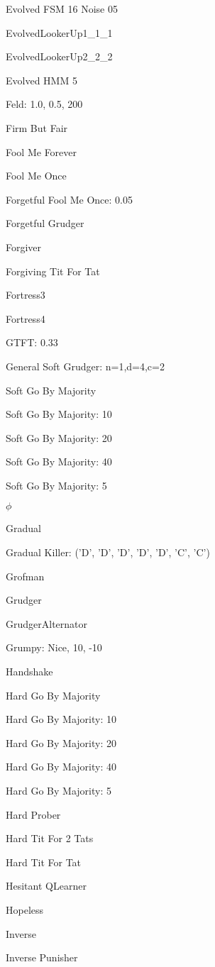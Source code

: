 \item Evolved FSM 16 Noise 05
\item EvolvedLookerUp1\_1\_1
\item EvolvedLookerUp2\_2\_2
\item Evolved HMM 5
\item Feld: 1.0, 0.5, 200
\item Firm But Fair
\item Fool Me Forever
\item Fool Me Once
\item Forgetful Fool Me Once: 0.05
\item Forgetful Grudger
\item Forgiver
\item Forgiving Tit For Tat
\item Fortress3
\item Fortress4
\item GTFT: 0.33
\item General Soft Grudger: n=1,d=4,c=2
\item Soft Go By Majority
\item Soft Go By Majority: 10
\item Soft Go By Majority: 20
\item Soft Go By Majority: 40
\item Soft Go By Majority: 5
\item $\phi$
\item Gradual
\item Gradual Killer: ('D', 'D', 'D', 'D', 'D', 'C', 'C')
\item Grofman
\item Grudger
\item GrudgerAlternator
\item Grumpy: Nice, 10, -10
\item Handshake
\item Hard Go By Majority
\item Hard Go By Majority: 10
\item Hard Go By Majority: 20
\item Hard Go By Majority: 40
\item Hard Go By Majority: 5
\item Hard Prober
\item Hard Tit For 2 Tats
\item Hard Tit For Tat
\item Hesitant QLearner
\item Hopeless
\item Inverse
\item Inverse Punisher
